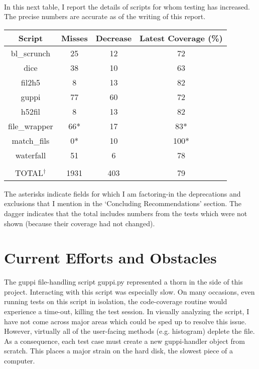 \documentclass[12pt]{article}
\begin{document}
\begin{center}
\

In this next table, I report the details of scripts for whom testing has increased. The precise numbers are accurate as of the writing of this report.

 \begin{tabular}{||c c c c||} 
 \hline
 Script & Misses & Decrease & Latest Coverage (\%)\\ [0.5ex] 
\hline
bl\_scrunch & 25 & 12 & 72 \\
\hline
dice & 38 & 10 & 63 \\
\hline
fil2h5 & 8 & 13 & 82 \\
\hline
guppi & 77 & 60 & 72 \\
\hline
h52fil & 8 & 13 & 82 \\
\hline
file\_wrapper & 66* & 17 & 83* \\
\hline
match\_fils & 0* & 10 & 100* \\
\hline
waterfall & 51 & 6 & 78 \\
\hline
&&&
\\
\hline
TOTAL$^\dagger$ & 1931 & 403 & 79 \\ [1ex] 
\hline
\end{tabular}
\end{center}

The asterisks indicate fields for which I am factoring-in the deprecations and exclusions that I mention in the `Concluding Recommendations' section. The dagger indicates that the total includes numbers from the tests which were not shown (because their coverage had not changed).


\section{Current Efforts and Obstacles}

\quad \quad The guppi file-handling script guppi.py represented a thorn in the side of this project. Interacting with this script was especially slow. On many occasions, even running tests on this script in isolation, the code-coverage routine would experience a time-out, killing the test session. In visually analyzing the script, I have not come across major areas which could be sped up to resolve this issue. However, virtually all of the user-facing methods (e.g. histogram) deplete the file. As a consequence, each test case must create a new guppi-handler object from scratch. This places a major strain on the hard disk, the slowest piece of a computer.
\end{document}
